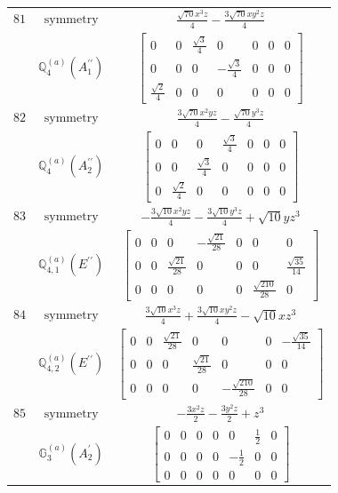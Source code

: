 \documentclass[fleqn,8pt,landscape]{jsarticle}
\begin{document}
\begin{longtable}{ccc}
$ 81 $ & $ \text{symmetry} $ & $ \frac{\sqrt{70} x^{3} z}{4} - \frac{3 \sqrt{70} x y^{2} z}{4} $ \\
$  $ & $ \mathbb{Q}_{4}^{(a)}(A_{1}^{\prime\prime}) $ & $ \begin{bmatrix} 0 & 0 & \frac{\sqrt{3}}{4} & 0 & 0 & 0 & 0 \\ 0 & 0 & 0 & - \frac{\sqrt{3}}{4} & 0 & 0 & 0 \\ \frac{\sqrt{2}}{4} & 0 & 0 & 0 & 0 & 0 & 0 \end{bmatrix} $ \\ \hline
$ 82 $ & $ \text{symmetry} $ & $ \frac{3 \sqrt{70} x^{2} y z}{4} - \frac{\sqrt{70} y^{3} z}{4} $ \\
$  $ & $ \mathbb{Q}_{4}^{(a)}(A_{2}^{\prime\prime}) $ & $ \begin{bmatrix} 0 & 0 & 0 & \frac{\sqrt{3}}{4} & 0 & 0 & 0 \\ 0 & 0 & \frac{\sqrt{3}}{4} & 0 & 0 & 0 & 0 \\ 0 & \frac{\sqrt{2}}{4} & 0 & 0 & 0 & 0 & 0 \end{bmatrix} $ \\ \hline
$ 83 $ & $ \text{symmetry} $ & $ - \frac{3 \sqrt{10} x^{2} y z}{4} - \frac{3 \sqrt{10} y^{3} z}{4} + \sqrt{10} y z^{3} $ \\
$  $ & $ \mathbb{Q}_{4,1}^{(a)}(E^{\prime\prime}) $ & $ \begin{bmatrix} 0 & 0 & 0 & - \frac{\sqrt{21}}{28} & 0 & 0 & 0 \\ 0 & 0 & \frac{\sqrt{21}}{28} & 0 & 0 & 0 & \frac{\sqrt{35}}{14} \\ 0 & 0 & 0 & 0 & 0 & \frac{\sqrt{210}}{28} & 0 \end{bmatrix} $ \\ \hline
$ 84 $ & $ \text{symmetry} $ & $ \frac{3 \sqrt{10} x^{3} z}{4} + \frac{3 \sqrt{10} x y^{2} z}{4} - \sqrt{10} x z^{3} $ \\
$  $ & $ \mathbb{Q}_{4,2}^{(a)}(E^{\prime\prime}) $ & $ \begin{bmatrix} 0 & 0 & \frac{\sqrt{21}}{28} & 0 & 0 & 0 & - \frac{\sqrt{35}}{14} \\ 0 & 0 & 0 & \frac{\sqrt{21}}{28} & 0 & 0 & 0 \\ 0 & 0 & 0 & 0 & - \frac{\sqrt{210}}{28} & 0 & 0 \end{bmatrix} $ \\ \hline
$ 85 $ & $ \text{symmetry} $ & $ - \frac{3 x^{2} z}{2} - \frac{3 y^{2} z}{2} + z^{3} $ \\
$  $ & $ \mathbb{G}_{3}^{(a)}(A_{2}^{\prime}) $ & $ \begin{bmatrix} 0 & 0 & 0 & 0 & 0 & \frac{1}{2} & 0 \\ 0 & 0 & 0 & 0 & - \frac{1}{2} & 0 & 0 \\ 0 & 0 & 0 & 0 & 0 & 0 & 0 \end{bmatrix} $ \\ \hline

\end{longtable}
\end{document}
